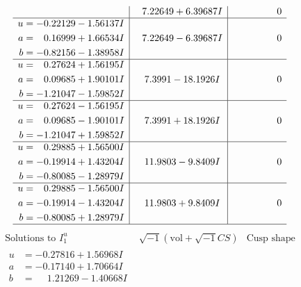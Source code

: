 \documentclass[1p]{elsarticle_modified}
\theoremstyle{definition}
\newcommand{\I}{\sqrt{-1}}
\begin{document}
$$\begin{array}{c|c|c}
 & \phantom{-}7.22649 + 6.39687 I & \phantom{-0.000000 } 0 \\ \hline\begin{aligned}
u &= -0.22129 - 1.56137 I \\
a &= \phantom{-}0.16999 + 1.66534 I \\
b &= -0.82156 - 1.38958 I\end{aligned}
 & \phantom{-}7.22649 - 6.39687 I & \phantom{-0.000000 } 0 \\ \hline\begin{aligned}
u &= \phantom{-}0.27624 + 1.56195 I \\
a &= \phantom{-}0.09685 + 1.90101 I \\
b &= -1.21047 - 1.59852 I\end{aligned}
 & \phantom{-}7.3991 - 18.1926 I & \phantom{-0.000000 } 0 \\ \hline\begin{aligned}
u &= \phantom{-}0.27624 - 1.56195 I \\
a &= \phantom{-}0.09685 - 1.90101 I \\
b &= -1.21047 + 1.59852 I\end{aligned}
 & \phantom{-}7.3991 + 18.1926 I & \phantom{-0.000000 } 0 \\ \hline\begin{aligned}
u &= \phantom{-}0.29885 + 1.56500 I \\
a &= -0.19914 + 1.43204 I \\
b &= -0.80085 - 1.28979 I\end{aligned}
 & \phantom{-}11.9803 - 9.8409 I & \phantom{-0.000000 } 0 \\ \hline\begin{aligned}
u &= \phantom{-}0.29885 - 1.56500 I \\
a &= -0.19914 - 1.43204 I \\
b &= -0.80085 + 1.28979 I\end{aligned}
 & \phantom{-}11.9803 + 9.8409 I & \phantom{-0.000000 } 0\\
 \hline 
 \end{array}$$\newpage$$\begin{array}{c|c|c}  
\text{Solutions to }I^u_{1}& \I (\text{vol} + \sqrt{-1}CS) & \text{Cusp shape}\\
 \hline 
\begin{aligned}
u &= -0.27816 + 1.56968 I \\
a &= -0.17140 + 1.70664 I \\
b &= \phantom{-}1.21269 - 1.40668 I\end{aligned}

\end{array}$$
\end{document}
